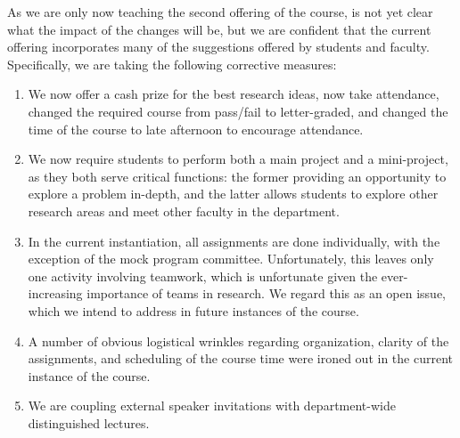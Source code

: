 As we are only now teaching the second offering of the course, is not
yet clear what the impact of the changes will be, but we are confident
that the current offering incorporates many of the suggestions offered
by students and faculty.  Specifically, we are taking the following
corrective measures:
\begin{enumerate}
\itemsep=-1pt
\item We now offer a cash prize for the best research ideas, now take
attendance, changed the required course from pass/fail to letter-graded,
and changed the time of the course to late afternoon to encourage
attendance.
\item We now require students to perform both a main project and a
mini-project, as they both serve critical functions: the former
providing an opportunity to explore a problem in-depth, and the latter
allows students to explore other research areas and meet other faculty
in the department.
\item In the current instantiation, all assignments are done individually,
with the exception of the mock program committee.  Unfortunately, this
leaves only one activity involving teamwork, which is unfortunate given
the ever-increasing importance of teams in research.  We regard this as
an open issue, which we intend to address in future instances of the
course.
\item A number of obvious logistical wrinkles regarding organization, clarity
of the assignments, and scheduling of the course time were ironed out in
the current instance of the course.
\item We are coupling external speaker invitations with department-wide
distinguished lectures.
\end{enumerate}

